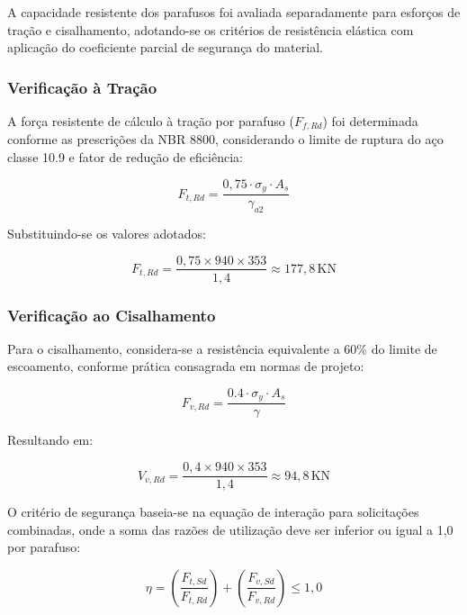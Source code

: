 \documentclass[12pt, a4paper]{article}
\begin{document}
A capacidade resistente dos parafusos foi avaliada separadamente para esforços de tração e cisalhamento, adotando-se os critérios de resistência elástica com aplicação do coeficiente parcial de segurança do material.

\subsubsection{Verificação à Tração}

A força resistente de cálculo à tração por parafuso ($F_{f,Rd}$) foi determinada conforme as prescrições da NBR 8800, considerando o limite de ruptura do aço classe 10.9 e fator de redução de eficiência:

\begin{equation}
F_{t,Rd} = \frac{0,75 \cdot \sigma_{y} \cdot A_s}{\gamma_{a2}}
\end{equation}

Substituindo-se os valores adotados:

\begin{equation}
F_{t,Rd} = \frac{0,75 \times 940 \times 353}{1{,}4}  \approx 177{,}8 \, \text{KN}
\end{equation}

\subsubsection{Verificação ao Cisalhamento}

Para o cisalhamento, considera-se a resistência equivalente a 60\% do limite de escoamento, conforme prática consagrada em normas de projeto:

\begin{equation}
F_{v,Rd} = \frac{0.4 \cdot \sigma_{y} \cdot A_s}{\gamma}
\end{equation}

Resultando em:

\begin{equation}
V_{v,Rd} = \frac{0{,}4 \times 940 \times 353}{1{,}4} \approx 94{,}8 \, \text{KN}
\end{equation}

O critério de segurança baseia-se na equação de interação para solicitações combinadas, onde a soma das razões de utilização deve ser inferior ou igual a 1,0 por parafuso:

\begin{equation}
    \eta = \left( \frac{F_{t,Sd}}{F_{t,Rd}} \right) + \left( \frac{F_{v,Sd}}{F_{v,Rd}} \right) \leq 1,0
\end{equation}
\end{document}
